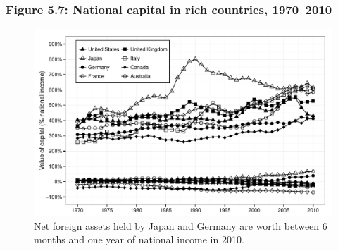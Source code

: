 \documentclass[t]{beamer}\usepackage[]{graphicx}\usepackage[]{color}
\newenvironment{knitrout}{}{} %
\begin{document}
\begin{frame}[label=Figure_5_7]
\frametitle{Figure 5.7: National capital in rich countries, 1970--2010}
\begin{figure}[t]
\begin{minipage}[b]{\textwidth}
\centering
\begin{knitrout}\footnotesize
{}\color{fgcolor}

{\centering \includegraphics[width=1\linewidth]{figures/bw/Figure_5_7} 

}



\end{knitrout}
\caption{Net foreign assets held by Japan and Germany are worth between 6 months and one year of national income in 2010.}
\end{minipage}
\end{figure}
\end{frame}
\end{document}

